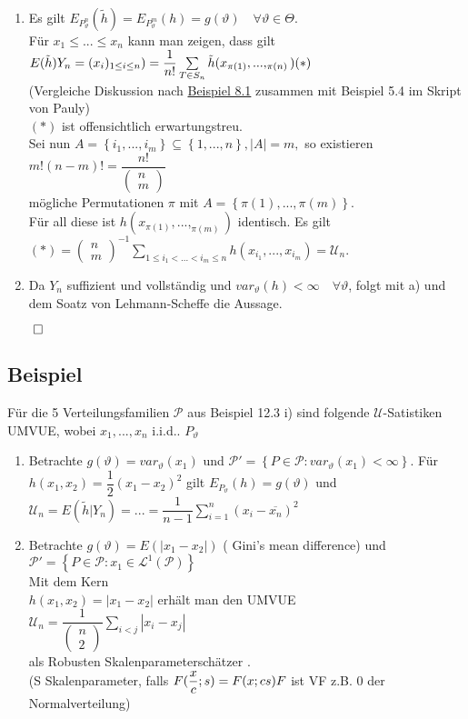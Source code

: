\documentclass[german,10pt,oneside, fleqn, a4paper]{article}
\newcommand{\sm}[2][\infty]{\sum\limits_{#2}^{#1}}
\newcommand{\brac}[1]{\left\lbrace #1\right\rbrace}
\newcommand{\QED}{\begin{flushright}$\qed$\end{flushright}}
\newcommand{\mat}[1]{\begin{pmatrix}#1\end{pmatrix}}
\newcommand{\mc}[1]{\mathcal{#1}}
\newcommand{\lp}[1]{\mc{L}^{#1}}
\newcommand{\1}[1]{1_{#1}}
\newcommand{\2}[1]{\1{\brac{#1}}}
\newcommand{\p}{\mc{P}}
\newcommand{\uu}{\mc{U}}
\newcommand{\sumi}{\sm[n]{i=1}}
\newcommand{\qf}{\quad\forall}
\begin{document}
\begin{enumerate}[label=(\alph*)]
\item Es gilt $E_{P_\vartheta^n}(\tilde h)=E_{P_\vartheta^m}(h)=g(\vartheta)\qf\vartheta\in\Theta$. \\Für $x_1\leq...\leq x_n$ kann man zeigen, dass gilt\\
$E(\tilde h)Y_n=(x_i)_{1\leq i\leq n})=\dfrac{1}{n!}\sum\limits_{T\in S_n}\tilde h(x_{\pi(1)},...,_{\pi(n)})\hfill(*)$ \\(Vergleiche Diskussion nach \hyperref[8.1]{Beispiel 8.1} zusammen mit Beispiel 5.4 im Skript von Pauly)\\
$(*)$ ist offensichtlich erwartungstreu.\\
Sei nun $A=\brac{i_1,...,i_m}\subseteq\brac{1,...,n}, |A|=m,$ so existieren\\
$m!(n-m)!=\dfrac{n!}{\mat{n\\m}}$\\
mögliche Permutationen $\pi$ mit $A=\brac{\pi(1),...,\pi(m)}.$\\
Für all diese ist $h(x_{\pi(1)},...,_{\pi(m)})$ identisch. Es gilt\\
$(*)=\mat{n\\m}^{-1}\sum\limits_{1\leq i_1<...<i_m\leq n}h(x_{i_1},...,x_{i_m})=\uu_n.$
\item Da $Y_n$ suffizient und vollständig und $var_\vartheta(h)<\infty\qf\vartheta$, folgt mit a) und dem Soatz von Lehmann-Scheffe die Aussage.

\end{enumerate}\QED

\subsection{Beispiel}
\label{12.7}
Für die 5 Verteilungsfamilien $\p$ aus Beispiel 12.3 i) sind folgende $\uu$-Satistiken UMVUE, wobei $x_1,...,x_n$ i.i.d.. $P_\vartheta$\begin{enumerate}[label=(\alph*)]
\item Betrachte $g(\vartheta)=var_\vartheta(x_1)$ und $\p'=\brac{P\in\p:var_\vartheta(x_1)<\infty}$. Für \\
$h(x_1,x_2)=\dfrac{1}{2}(x_1-x_2)^2$ gilt $E_{P_\vartheta}(h)=g(\vartheta)$ und $\uu_n=E(\tilde h|Y_n)=...=\dfrac{1}{n-1}\sumi (x_i-\overline{x_n})^2$
\item Betrachte $g(\vartheta)=E(|x_1-x_2|)$ ( Gini's mean difference) und\\
$\p'=\brac{P\in\p:x_1\in\lp{1}(\p)}$\\
Mit dem Kern \\
$h(x_1,x_2)=|x_1-x_2|$ erhält man den UMVUE\\
$\uu_n=\dfrac{1}{\mat{n\\2}}\sum\limits_{i<j}|x_i-x_j|$\\
als \glqq Robusten Skalenparameterschätzer \grqq.\\
(S Skalenparameter, falls $F(\dfrac{x}{c};s)=F(x;cs)\\
F$ ist VF z.B. 0 der Normalverteilung)
\end{enumerate}
\end{document}
